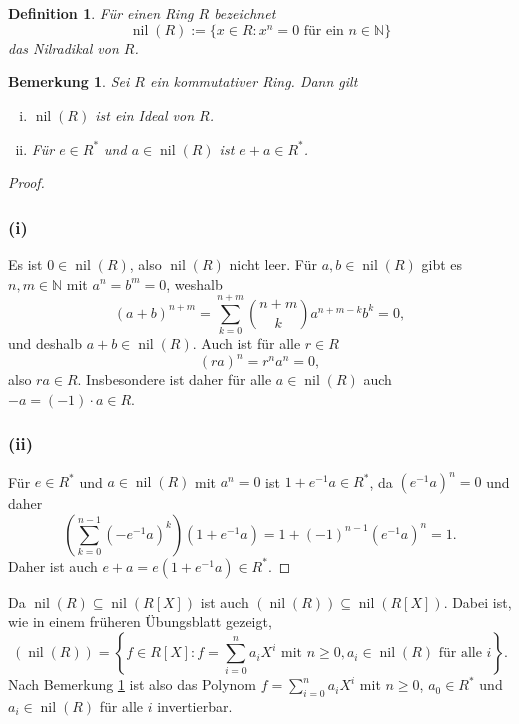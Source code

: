 \documentclass[a4paper,10pt]{article}
\newcounter{satze}
\newtheorem{bem}[satze]{Bemerkung}
\newtheorem*{defi}{Definition}
\theoremstyle{definition}
\newcommand{\N}{\mathbb{N}}
\newcommand{\nil}{\operatorname{nil}}
\begin{document}
\section{}

\begin{defi}
 Für einen Ring $R$ bezeichnet
 \[
  \nil(R) := \{x \in R : x^n = 0 \text{ für ein } n \in \N\}
 \]
 das Nilradikal von $R$.
\end{defi}

\begin{bem}\label{bem: nilradikal}
 Sei $R$ ein kommutativer Ring. Dann gilt
 \begin{enumerate}[(i)]
  \item $\nil(R)$ ist ein Ideal von $R$.
  \item Für $e \in R^*$ und $a \in \nil(R)$ ist $e+a \in R^*$.
 \end{enumerate}
\end{bem}

\begin{proof}
 \subsubsection*{(i)}
  Es ist $0 \in \nil(R)$, also $\nil(R)$ nicht leer. Für $a,b \in \nil(R)$ gibt es $n,m \in \N$ mit $a^n = b^m = 0$, weshalb
  \[
   (a+b)^{n+m} = \sum_{k=0}^{n+m} \binom{n+m}{k} a^{n+m-k} b^k = 0,
  \]
  und deshalb $a+b \in \nil(R)$. Auch ist für alle $r \in R$
  \[
   (ra)^n = r^n a^n = 0,
  \]
  also $ra \in R$. Insbesondere ist daher für alle $a \in \nil(R)$ auch $-a = (-1) \cdot a \in R$.
 \subsubsection*{(ii)}
  Für $e \in R^*$ und $a \in \nil(R)$ mit $a^n = 0$ ist $1+e^{-1}a \in R^*$, da $\left(e^{-1}a\right)^n = 0$ und daher
  \[
   \left(\sum_{k=0}^{n-1} \left(-e^{-1}a\right)^k\right) \left(1+e^{-1}a\right)
   = 1+ (-1)^{n-1} \left(e^{-1}a\right)^n
   = 1.
  \]
  Daher ist auch $e+a = e\left(1+e^{-1}a\right) \in R^*$.
\end{proof}

Da $\nil(R) \subseteq \nil(R[X])$ ist auch $\left(\nil(R)\right) \subseteq \nil(R[X])$. Dabei ist, wie in einem früheren Übungsblatt gezeigt,
\[
 \left(\nil(R)\right)
 = \left\{f \in R[X] : f = \sum_{i=0}^n a_i X^i \text{ mit } n \geq 0, a_i \in \nil(R) \text{ für alle } i\right\}.
\]
Nach Bemerkung \ref{bem: nilradikal} ist also das Polynom $f = \sum_{i=0}^n a_i X^i$ mit $n \geq 0$, $a_0 \in R^*$ und $a_i \in \nil(R)$ für alle $i$ invertierbar.
\end{document}
